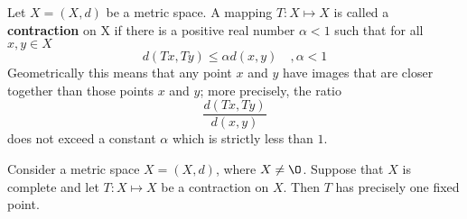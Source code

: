 \documentclass{article}
\theoremstyle{remark}
\begin{document}
\begin{definition}[Contraction]
  Let $X = \left( X,d \right)$ be a metric space. A mapping $T: X \mapsto X$ is called a \textbf{contraction}  on X if there is a positive real number $\alpha < 1$ such that for all $x,y \in X$ \[
    d\left( Tx,Ty \right) \le \alpha d\left( x,y \right) \quad , \alpha  < 1 
  \] 
  Geometrically this means that any point $x$ and $y$ have images that are closer together than those points $x$ and $y$; more precisely, the ratio  \[
\frac{d\left( Tx, Ty \right)}{d \left( x,y \right)}
  \] 
  does not exceed a constant $\alpha $ which is strictly less than $1$.
\end{definition}

\begin{theorem}
  Consider a metric space $X=\left( X,d \right)$, where $X \neq \O$. Suppose that $X$ is complete and let $T: X \mapsto X$ be a contraction on $X$. Then $T$ has precisely one fixed point.
\end{theorem}
\end{document}
